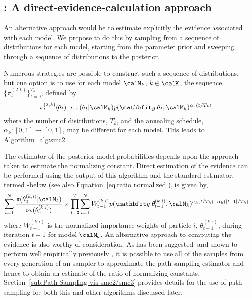 \subsection[SMC2: A direct-evidence-calculation approach]
{\smc[2]: A direct-evidence-calculation approach}
\label{sub:smc2: A direct-evidence-calculation approach}

An alternative approach would be to estimate explicitly the evidence
associated with each model. We propose to do this by sampling from a sequence
of distributions for each model, starting from the parameter prior and
sweeping through a sequence of distributions to the posterior.

Numerous strategies are possible to construct such a sequence of
distributions, but one option is to use for each model $\calM_k$, $k\in\calK$,
the sequence $\{\pi_t^{(2,k)}\}_{t=0}^{T_k}$, defined by
\begin{equation}
  \pi_t^{(2,k)}(\theta_t) \propto
  \pi(\theta_t|\calM_k)p(\data|\theta_t,\calM_k)^{\alpha_k(t/T_k)}.
  \label{eq:geometry_2}
\end{equation}
where the number of distributions, $T_k$, and the annealing schedule,
$\alpha_k:[0,1]\to[0,1]$, may be different for each model. This leads to
Algorithm~\ref{alg:smc2}.



The estimator of the posterior model probabilities depends upon the approach
taken to estimate the normalizing constant. Direct estimation of the evidence
can be performed using the output of this \smc algorithm and the standard
estimator, termed \smc[2]-\ds below (see also Equation~\eqref{eq:ratio
  normalized}), is given by,
\begin{equation}
  \sum_{i=1}^N \frac{\pi(\theta_0^{(k,i)}|\calM_k)}{\nu_k(\theta_0^{(k,i)})}
  \times \prod_{t=2}^T \sum_{i=1}^N W_{t-1}^{(k,i)}
  p(\data|\theta_{t-1}^{(k,i)},\calM_k)^{\alpha_k(t/T_k) - \alpha_k([t-1]/T_k)}
  \label{eq:smc2-ds}
\end{equation}
where $W_{t-1}^{(k,i)}$ is the normalized importance weights of particle $i$,
$\theta_{t-1}^{(k,i)}$, during iteration $t-1$ for model $\calM_k$. An
alternative approach to computing the evidence is also worthy of
consideration. As has been suggested, and shown to perform well empirically
previously \cite{Johansen:2006wm}, it is possible to use all
of the samples from every generation of an \smc sampler to approximate the
path sampling estimator and hence to obtain an estimate of the ratio of
normalizing constants. Section~\ref{sub:Path Sampling via smc2/smc3} provides
details for the use of path sampling for both this and other \smc algorithms
discussed later.

